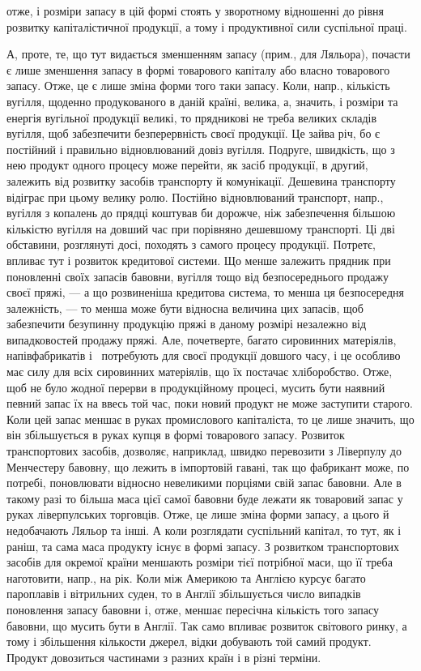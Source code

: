 \parcont{}  %
отже, і розміри запасу в цій формі стоять у зворотному відношенні до
рівня розвитку капіталістичної продукції, а тому і продуктивної сили
суспільної праці.

А, проте, те, що тут видається зменшенням запасу (прим., для Ляльора),
почасти є лише зменшення запасу в формі товарового капіталу або
власно товарового запасу. Отже, це є лише зміна форми того таки запасу.
Коли, напр., кількість вугілля, щоденно продукованого в даній країні,
велика, а, значить, і розміри та енергія вугільної продукції великі, то
прядникові не треба великих складів вугілля, щоб забезпечити безперервність
своєї продукції. Це зайва річ, бо є постійний і правильно
відновлюваний довіз вугілля. Подруге, швидкість, що з нею продукт
одного процесу може перейти, як засіб продукції, в другий, залежить
від розвитку засобів транспорту й комунікації. Дешевина транспорту
відіграє при цьому велику ролю. Постійно відновлюваний транспорт,
напр., вугілля з копалень до прядці коштував би дорожче, ніж забезпечення
більшою кількістю вугілля на довший час при порівняно дешевшому
транспорті. Ці дві обставини, розглянуті досі, походять з самого процесу
продукції. Потретє, впливає тут і розвиток кредитової системи. Що менше
залежить прядник при поновленні своїх запасів бавовни, вугілля тощо від
безпосереднього продажу своєї пряжі, — а що розвиненіша кредитова система,
то менша ця безпосередня залежність, — то менша може бути відносна
величина цих запасів, щоб забезпечити безупинну продукцію пряжі
в даному розмірі незалежно від випадковостей продажу пряжі. Але,
почетверте, багато сировинних матеріялів, напівфабрикатів і~ потребують
для своєї продукції довшого часу, і це особливо має силу для
всіх сировинних матеріялів, що їх постачає хліборобство. Отже, щоб не
було жодної перерви в продукційному процесі, мусить бути наявний
певний запас їх на ввесь той час, поки новий продукт не може заступити
старого. Коли цей запас меншає в руках промислового капіталіста,
то це лише значить, що він збільшується в руках купця в
формі товарового запасу. Розвиток транспортових засобів, дозволяє, наприклад,
швидко перевозити з Ліверпулу до Менчестеру бавовну, що
лежить в імпортовій гавані, так що фабрикант може, по потребі, поновлювати
відносно невеликими порціями свій запас бавовни. Але в такому
разі то більша маса цієї самої бавовни буде лежати як товаровий
запас у руках ліверпулських торговців. Отже, це лише зміна форми запасу,
а цього й недобачають Ляльор та інші. А коли розглядати суспільний
капітал, то тут, як і раніш, та сама маса продукту існує в формі
запасу. З розвитком транспортових засобів для окремої країни меншають
розміри тієї потрібної маси, що її треба наготовити, напр., на рік.
Коли між Америкою та Англією курсує багато пароплавів і вітрильних
суден, то в Англії збільшується число випадків поновлення запасу бавовни
і, отже, меншає пересічна кількість того запасу бавовни, що мусить
бути в Англії. Так само впливає розвиток світового ринку, а
тому і збільшення кількости джерел, відки добувають той самий
продукт. Продукт довозиться частинами з разних країн і в різні терміни.
